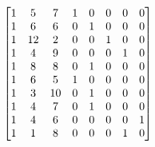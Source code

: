 \documentclass[preview]{standalone}
\begin{document}
\begin{align*}
\special{dvisvgm:raw <g id='unique000'>}\begin{bmatrix}1&5&7&1&0&0&0&0\\1&6&6&0&1&0&0&0\\1&12&2&0&0&1&0&0\\1&4&9&0&0&0&1&0\\1&8&8&0&1&0&0&0\\1&6&5&1&0&0&0&0\\1&3&10&0&1&0&0&0\\1&4&7&0&1&0&0&0\\1&4&6&0&0&0&0&1\\1&1&8&0&0&0&1&0\end{bmatrix}\special{dvisvgm:raw </g>}
\end{align*}
\end{document}
